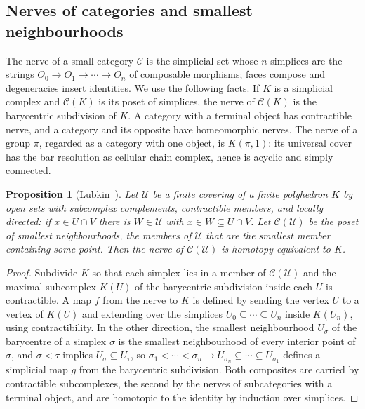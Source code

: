 \documentclass[11pt]{amsart}
\theoremstyle{plain}
\newtheorem{proposition}[theorem]{Proposition}
\theoremstyle{definition}
\numberwithin{equation}{section}
\begin{document}
\subsection{Nerves of categories and smallest neighbourhoods}
The nerve of a small category $\mathcal C$ is the simplicial set whose $n$-simplices are the strings $O_0\to O_1\to\cdots\to O_n$ of composable morphisms; faces compose and degeneracies insert identities.
We use the following facts.
If $K$ is a simplicial complex and $\mathcal C(K)$ is its poset of simplices, the nerve of $\mathcal C(K)$ is the barycentric subdivision of $K$.
A category with a terminal object has contractible nerve, and a category and its opposite have homeomorphic nerves.
The nerve of a group $\pi$, regarded as a category with one object, is $K(\pi,1)$: its universal cover has the bar resolution as cellular chain complex, hence is acyclic and simply connected.

\begin{proposition}[Lubkin~\cite{Lubkin}]\label{prop:lubkin}
Let $\mathcal U$ be a finite covering of a finite polyhedron $K$ by open sets with subcomplex complements, contractible members, and locally directed: if $x\in U\cap V$ there is $W\in\mathcal U$ with $x\in W\subseteq U\cap V$.
Let $\mathcal C(\mathcal U)$ be the poset of \emph{smallest neighbourhoods}, the members of $\mathcal U$ that are the smallest member containing some point.
Then the nerve of $\mathcal C(\mathcal U)$ is homotopy equivalent to $K$.
\end{proposition}

\begin{proof}
Subdivide $K$ so that each simplex lies in a member of $\mathcal C(\mathcal U)$ and the maximal subcomplex $K(U)$ of the barycentric subdivision inside each $U$ is contractible.
A map $f$ from the nerve to $K$ is defined by sending the vertex $U$ to a vertex of $K(U)$ and extending over the simplices $U_0\subseteq\cdots\subseteq U_n$ inside $K(U_n)$, using contractibility.
In the other direction, the smallest neighbourhood $U_\sigma$ of the barycentre of a simplex $\sigma$ is the smallest neighbourhood of every interior point of $\sigma$, and $\sigma<\tau$ implies $U_\sigma\subseteq U_\tau$, so $\sigma_1<\cdots<\sigma_n\mapsto U_{\sigma_n}\subseteq\cdots\subseteq U_{\sigma_1}$ defines a simplicial map $g$ from the barycentric subdivision.
Both composites are carried by contractible subcomplexes, the second by the nerves of subcategories with a terminal object, and are homotopic to the identity by induction over simplices.
\end{proof}
\end{document}
